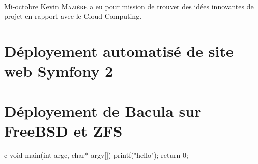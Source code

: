 \paragraph*{}
Mi-octobre Kevin \textsc{Mazière} a eu pour mission de trouver des idées innovantes de projet en rapport avec le Cloud Computing.

\section{Déployement automatisé de site web Symfony 2}


\section{Déployement de Bacula sur FreeBSD et ZFS}


\begin{pygmented}{c}
void main(int argc, char* argv[])
{
	printf("hello");
	return 0;
}
\end{pygmented}






\cite{test}
